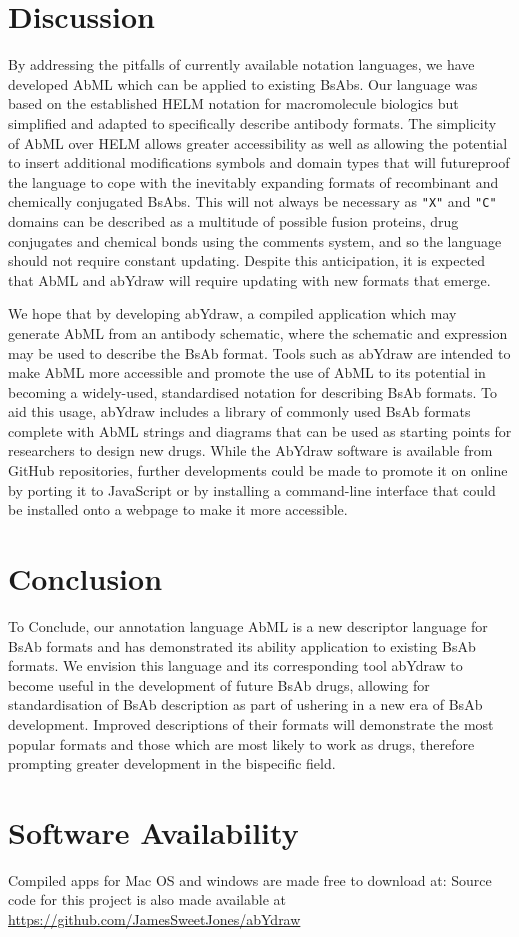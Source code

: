 \documentclass{article}
\begin{document}
\section{Discussion}

By addressing the pitfalls of currently available notation languages,
we have developed AbML which can be applied to existing BsAbs. Our
language was based on the established HELM notation for macromolecule
biologics but simplified and adapted to specifically describe antibody
formats. The simplicity of AbML over HELM allows greater accessibility
as well as allowing the potential to insert additional modifications
symbols and domain types that will futureproof the language to cope
with the inevitably expanding formats of recombinant and chemically
conjugated BsAbs. This will not always be necessary as \verb|"X"| and \verb|"C"|
domains can be described as a multitude of possible fusion proteins,
drug conjugates and chemical bonds using the comments system, and so
the language should not require constant updating. Despite this
anticipation, it is expected that AbML and abYdraw will require
updating with new formats that emerge. 

We hope that by developing abYdraw, a compiled application which may
generate AbML from an antibody schematic, where the schematic and
expression may be used to describe the BsAb format. Tools such as
abYdraw are intended to make AbML more accessible and promote the use
of AbML to its potential in becoming a widely-used, standardised
notation for describing BsAb formats. To aid this usage, abYdraw
includes a library of commonly used BsAb formats complete with AbML
strings and diagrams that can be used as starting points for
researchers to design new drugs. While the AbYdraw software is
available from GitHub repositories, further developments could be made
to promote it on online by porting it to JavaScript or by installing a
command-line interface that could be installed onto a webpage to make
it more accessible.  


\section{Conclusion}

To Conclude, our annotation language AbML is a new descriptor language
for BsAb formats and has demonstrated its ability application to
existing BsAb formats. We envision this language and its corresponding
tool abYdraw to become useful in the development of future BsAb drugs,
allowing for standardisation of BsAb description as part of ushering
in a new era of BsAb development. Improved descriptions of their
formats will demonstrate the most popular formats and those which are
most likely to work as drugs, therefore prompting greater development
in the bispecific field.  

\section{Software Availability}
Compiled apps for Mac OS and windows are made free to download at:
Source code for this project is also made available at
\url{https://github.com/JamesSweetJones/abYdraw}

 
\end{document}
